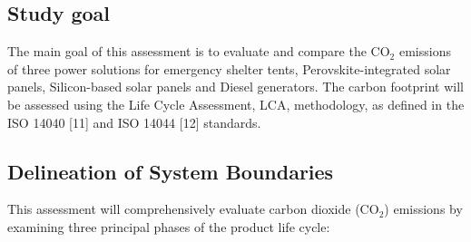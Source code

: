 \documentclass{article}
\begin{document}
\subsection*{Study goal}
The main goal of this assessment is to evaluate and compare the {CO$_2$ emissions} of three power solutions for emergency shelter tents, {Perovskite-integrated solar panels}, {Silicon-based solar panels} and {Diesel generators}. The carbon footprint will be assessed using the Life Cycle Assessment, LCA, methodology, as defined in the ISO 14040 [11] and ISO 14044 [12] standards.
\subsection*{Delineation of System Boundaries}
This assessment will comprehensively evaluate carbon dioxide (CO$_2$) emissions by examining three principal phases of the product life cycle:
\end{document}
